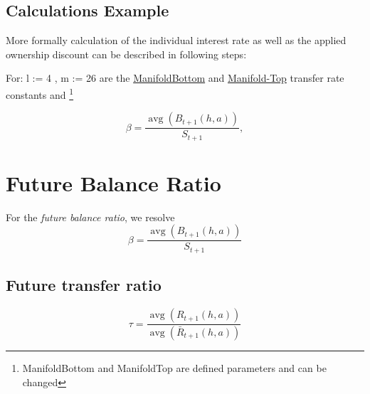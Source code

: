 \subsection{Calculations Example}
More formally calculation of the individual interest rate as well as the applied ownership discount can be described in following steps:

For: l := 4 , m := 26 are the \url{ManifoldBottom} and \url{Manifold-Top} transfer rate constants and \footnote{ManifoldBottom and ManifoldTop are defined parameters and can be changed}

\label{sec:Calculations}
\begin{equation}
	\beta=\frac{\operatorname{avg}\left(B_{t+1}(h, a)\right)}{S_{t+1}}, 
\end{equation}
\newpage
\section{Future Balance Ratio}
For the \textit{future balance ratio}, we resolve
\label{sec:Calculations}
\begin{equation}
	\beta=\frac{\operatorname{avg}\left(B_{t+1}(h, a)\right)}{S_{t+1}}
\end{equation}
\label{future transfer ratio}
\subsection{Future transfer ratio}
\begin{equation}
	\tau=\frac{\operatorname{avg}\left(R_{t+1}(h, a)\right)}{\operatorname{avg}\left(\bar{R}_{t+1}(h, a)\right)}
\end{equation}

